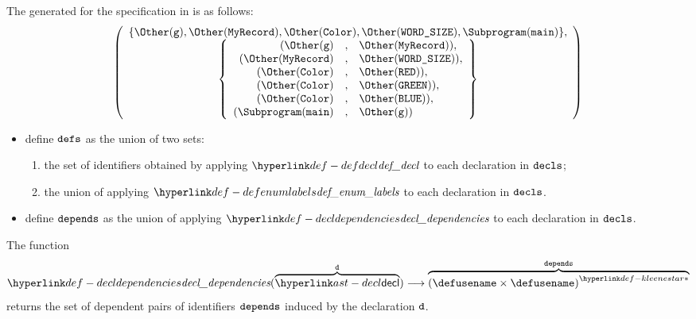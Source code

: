The \dependencygraphterm{} generated for the specification in 
is as follows:
\[
\left(
\begin{array}{c}
  \{ \Other(\vg), \Other(\MyRecord), \Other(\Color), \Other(\vWORDSIZE), \Subprogram(\vmain) \},\\
  \left\{\begin{array}{rcl}
    ( \Other(\vg) &,&          \Other(\MyRecord) ),\\
    ( \Other(\MyRecord) &,&    \Other(\vWORDSIZE) ),\\
    ( \Other(\Color) &,&       \Other(\RED) ),\\
    ( \Other(\Color) &,&       \Other(\GREEN) ),\\
    ( \Other(\Color) &,&       \Other(\BLUE) ),\\
    ( \Subprogram(\vmain) &,&  \Other(\vg) )\\
  \end{array}\right\}
\end{array}
\right)
\]

\ProseParagraph
\AllApply
\begin{itemize}
  \item define $\defs$ as the union of two sets:
  \begin{enumerate}
  \item the set of identifiers obtained by applying $\defdecl$ to each declaration in $\decls$;
  \item the union of applying $\defenumlabels$ to each declaration in $\decls$.
  \end{enumerate}
  \item define $\dependencies$ as the union of applying $\decldependencies$ to each declaration in $\decls$.
\end{itemize}

\FormallyParagraph
\begin{mathpar}
\end{mathpar}

\hypertarget{def-decldependencies}{}
The function
\[
\decldependencies(\overname{\decl}{\vd}) \aslto \overname{\KleeneStar{(\defusename\times\defusename)}}{\dependencies}
\]
returns the set of dependent pairs of identifiers $\dependencies$ induced by the declaration $\vd$.

